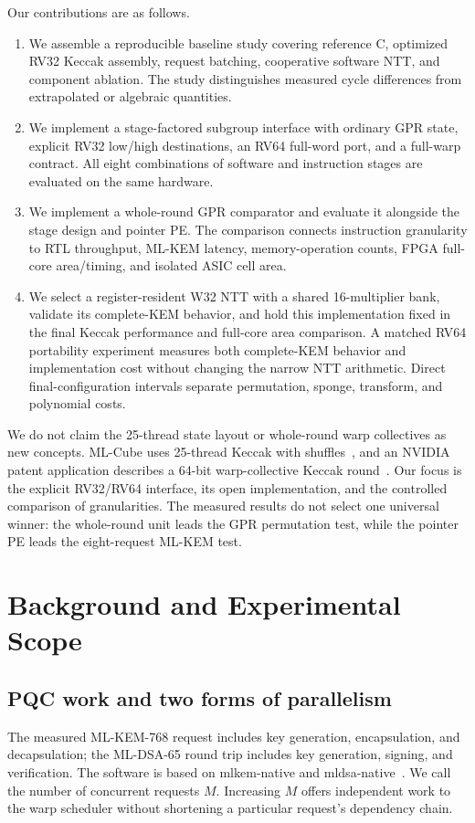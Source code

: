 \documentclass[conference,letterpaper]{IEEEtran}
\begin{document}
Our contributions are as follows.
\begin{enumerate}
\item We assemble a reproducible baseline study covering reference C,
optimized RV32 Keccak assembly, request batching, cooperative software NTT,
and component ablation. The study distinguishes measured cycle differences
from extrapolated or algebraic quantities.
\item We implement a stage-factored subgroup interface with ordinary GPR state,
explicit RV32 low/high destinations, an RV64 full-word port, and a full-warp contract.
All eight combinations of software and instruction stages are evaluated on
the same hardware.
\item We implement a whole-round GPR comparator and evaluate it alongside
the stage design and pointer PE. The comparison connects instruction
granularity to RTL throughput, ML-KEM latency, memory-operation counts,
FPGA full-core area/timing, and isolated ASIC cell area.
\item We select a register-resident W32 NTT with a shared 16-multiplier bank,
validate its complete-KEM behavior, and hold this implementation fixed in
the final Keccak performance and full-core area comparison. A matched RV64
portability experiment measures both complete-KEM behavior and implementation
cost without changing the narrow NTT arithmetic. Direct final-configuration
intervals separate permutation, sponge, transform, and polynomial costs.
\end{enumerate}

We do not claim the 25-thread state layout or whole-round warp collectives
as new concepts. ML-Cube uses 25-thread Keccak with
shuffles~\cite{mlcube}, and an NVIDIA patent application describes a
64-bit warp-collective Keccak round~\cite{collectivepatent}.
Our focus is the explicit RV32/RV64 interface, its open implementation, and the
controlled comparison of granularities. The measured results do not select
one universal winner: the whole-round unit leads the GPR permutation test,
while the pointer PE leads the eight-request ML-KEM test.

\section{Background and Experimental Scope}
\subsection{PQC work and two forms of parallelism}
The measured ML-KEM-768 request includes key generation, encapsulation, and
decapsulation; the ML-DSA-65 round trip includes key generation, signing,
and verification. The software is based on mlkem-native and
mldsa-native~\cite{mlkemnative,mldsanative}. We call the number of concurrent
requests $M$. Increasing $M$ offers independent work to the warp scheduler
without shortening a particular request's dependency chain.
\end{document}
